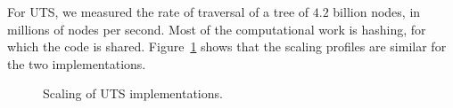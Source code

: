 For UTS, we measured the rate of traversal of a tree of $4.2$ billion nodes, in
millions of nodes per second. Most of the computational work is hashing, for
which the code is shared. Figure~\ref{fig:uts-scaling} shows that the scaling
profiles are similar for the two implementations. 

\begin{figure}
\vspace{-0.3cm}
\hspace{-0.2cm}
\begingroup\graphicspath{{figures/}}\endgroup
\vspace{-0.2cm}
\caption{Scaling of UTS implementations.}
\label{fig:uts-scaling}
\end{figure}



